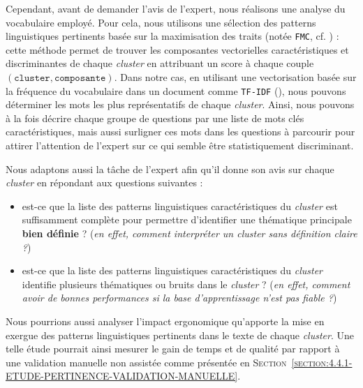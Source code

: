 			Cependant, avant de demander l'avis de l'expert, nous réalisons une analyse du vocabulaire employé.
			Pour cela, nous utilisons une sélection des patterns linguistiques pertinents basée sur la maximisation des traits (notée \texttt{FMC}, cf. \cite{lamirel-etal:2017:novel-approach-feature}) : cette méthode permet de trouver les composantes vectorielles caractéristiques et discriminantes de chaque \textit{cluster} en attribuant un score à chaque couple $(\texttt{cluster}, \texttt{composante})$.
			Dans notre cas, en utilisant une vectorisation basée sur la fréquence du vocabulaire dans un document comme \texttt{TF-IDF} (\cite{sparck-jones:1972:statistical-interpretation-term}), nous pouvons déterminer les mots les plus représentatifs de chaque \textit{cluster}.
			Ainsi, nous pouvons à la fois décrire chaque groupe de questions par une liste de mots clés caractéristiques, mais aussi surligner ces mots dans les questions à parcourir pour attirer l'attention de l'expert sur ce qui semble être statistiquement discriminant.
			
			Nous adaptons aussi la tâche de l'expert afin qu'il donne son avis sur chaque \textit{cluster} en répondant aux questions suivantes :
			\begin{itemize}
				\item est-ce que la liste des patterns linguistiques caractéristiques du \textit{cluster} est suffisamment complète pour permettre d'identifier une thématique principale \textbf{bien définie} ? (\textit{en effet, comment interpréter un \textit{cluster} sans définition claire ?})
				\item est-ce que la liste des patterns linguistiques caractéristiques du \textit{cluster} identifie plusieurs thématiques ou bruits dans le \textit{cluster} ? (\textit{en effet, comment avoir de bonnes performances si la base d'apprentissage n'est pas fiable ?})
			\end{itemize}
			
			\begin{leftBarIdea}
				Nous pourrions aussi analyser l'impact ergonomique qu'apporte la mise en exergue des patterns linguistiques pertinents dans le texte de chaque \textit{cluster}.
				Une telle étude pourrait ainsi mesurer le gain de temps et de qualité par rapport à une validation manuelle non assistée comme présentée en \textsc{Section~\ref{section:4.4.1-ETUDE-PERTINENCE-VALIDATION-MANUELLE}}.
			\end{leftBarIdea}
			
